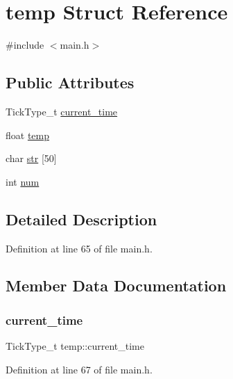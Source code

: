 \hypertarget{structtemp}{}\section{temp Struct Reference}
\label{structtemp}


{\ttfamily \#include $<$main.\+h$>$}

\subsection*{Public Attributes}
\begin{DoxyCompactItemize}
\item 
Tick\+Type\+\_\+t \hyperlink{structtemp_a083aa7339b28a78a71bfaef491294393}{current\+\_\+time}
\item 
float \hyperlink{structtemp_ab73df077c620529b5de4a6bdaf187113}{temp}
\item 
char \hyperlink{structtemp_af9b2099e55b58c3aabcde6e7dd077dae}{str} \mbox{[}50\mbox{]}
\item 
int \hyperlink{structtemp_ae43f5bf5870d8402a93778504a05f50a}{num}
\end{DoxyCompactItemize}


\subsection{Detailed Description}


Definition at line 65 of file main.\+h.



\subsection{Member Data Documentation}
\mbox{\label{structtemp_a083aa7339b28a78a71bfaef491294393}} 
\subsubsection{\texorpdfstring{current\+\_\+time}{current\_time}}
{\footnotesize\ttfamily Tick\+Type\+\_\+t temp\+::current\+\_\+time}



Definition at line 67 of file main.\+h.

\mbox{\label{structtemp_ae43f5bf5870d8402a93778504a05f50a}} 
